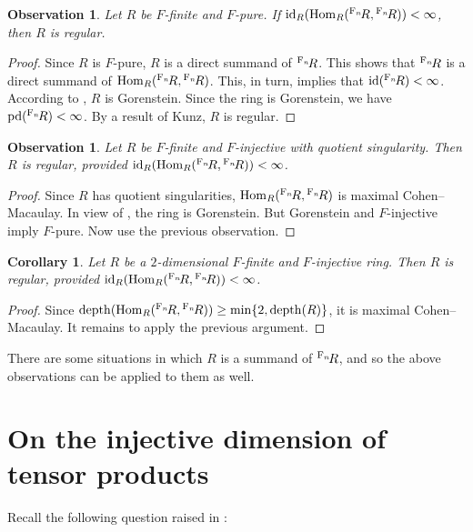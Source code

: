 \documentclass[10. pt,a4paper]{amsart}
\newtheorem{corollary}[theorem]{Corollary}
\newtheorem{observation}[theorem]{Observation}
\theoremstyle{definition}
\theoremstyle{remark}
\newcommand{\F}{\operatorname{F}}
\newcommand{\id}{\operatorname{id}}
\newcommand{\pd}{\operatorname{pd}}
\newcommand{\Hom}{\operatorname{Hom}}
\newcommand{\depth}{\operatorname{depth}}
\begin{document}
\begin{observation}
	Let $R$ be $F$-finite and $F$-pure. If $\id_R(\Hom_R(\up{\F_n} R, \up{\F_n} R)) < \infty$, then $R$ is regular.
\end{observation}

\begin{proof}
	Since $R$ is $F$-pure, $R$ is a direct summand of $\up{\F_n} R$. This shows that $\up{\F_n} R$ is a direct summand of $\Hom_R(\up{\F_n} R, \up{\F_n} R)$. This, in turn, implies that $\id(\up{\F_n}R) < \infty$. According to \cite[Proposition 3.2]{q1}, $R$ is Gorenstein. Since the ring is Gorenstein, we have $\pd(\up{\F_n} R) < \infty$. By a result of Kunz, $R$ is regular.
\end{proof}

\begin{observation}
	Let $R$ be $F$-finite and $F$-injective with quotient singularity. Then $R$ is regular, provided $\id_R(\Hom_R(\up{\F_n} R, \up{\F_n} R)) < \infty$.
\end{observation}

\begin{proof}
	Since $R$ has quotient singularities, $\Hom_R(\up{\F_n} R, \up{\F_n}R)$ is maximal Cohen--Macaulay. In view of \cite[Proposition 3.2]{q1}, the ring is Gorenstein. But Gorenstein and $F$-injective imply $F$-pure. Now use the previous observation.
\end{proof}

\begin{corollary}
	Let $R$ be a $2$-dimensional $F$-finite and $F$-injective ring. Then $R$ is regular, provided $\id_R(\Hom_R(\up{\F_n} R, \up{\F_n}R)) < \infty$.
\end{corollary}

\begin{proof}
	Since $\depth(\Hom_R(\up{\F_n}R, \up{\F_n} R)) \geq \min\{2, \depth(R)\}$, it is maximal Cohen--Macaulay. It remains to apply the previous argument.
\end{proof}

There are some situations in which $R$ is a summand of $\up{\F_n} R$, and so the above observations can be applied to them as well.

\section{On the injective dimension of tensor products}

Recall the following question raised in \cite[Question 4.2]{celgo}:
\end{document}
